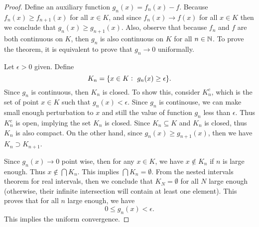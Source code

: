 \begin{proof}
	Define an auxiliary function $ g_n(x) = f_n(x)-f$. Because $ f_n(x) \geq f_{n+1}(x) $ for all $ x \in K $, and since $ f_n(x)\to f(x) $ for all $ x\in K $ then we conclude that $ g_n(x) \geq g_{n+1}(x) $. Also, observe that because $ f_n $ and $ f $ are both continuous on $ K $, then $ g_n $ is also continuous on $ K $ for all $ n \in \mathbb{N} $. To prove the theorem, it is equivalent to prove that $ g_n \to 0$ uniformally. 
	
	\noindent Let $\epsilon>0$ given. Define 
	\[ K_n = \{x\in K:\ g_n(x) \geq \epsilon\}. \]
	Since $ g_n $ is continuous, then $ K_n $ is closed. To show this, consider $ K_n^c $, which is the set of point $ x \in K $ such that $ g_n(x)<\epsilon $. Since $ g_n $ is continouse, we can make small enough perturbation to $  x $ and still the value of function $ g_n $ less than $ \epsilon $. Thus $ K_n^c $ is open, implying the set $ K_n $ is closed. Since $ K_n \subseteq K $ and $ K_n  $ is closed, thus $ K_n $ is also compact. On the other hand, since $ g_n(x) \geq g_{n+1}(x)  $, then we have 
	$ K_n \supset K_{n+1} $.  
	
	\noindent Since $ g_n(x) \to 0 $ point wise, then for any $ x \in K $,  we have $ x \notin K_n $ if $ n $ is large enough. Thus $ x \notin \bigcap K_n $. This implies $ \bigcap K_n = \emptyset $. From the nested intervals theorem for real intervals, then we conclude that $ K_N = \emptyset$ for all $ N $ large enough (otherwise, their infinite intersection will contain at least one element). This proves that for all $ n $ large enough, we have
	\[ 0 \leq g_n(x) < \epsilon. \]
	This implies the uniform convergence. 
\end{proof}











\newpage
